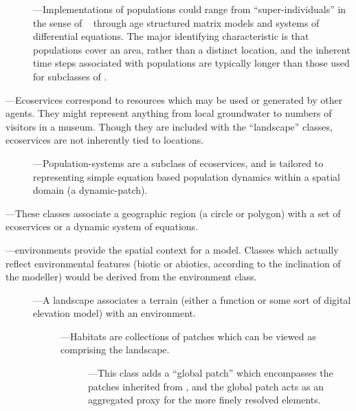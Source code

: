 \begin{description}
\begin{description}
\begin{description}
    \item[]---Implementations of populations
      could range from ``super-individuals'' in the sense of
      ~\citet{scheffer1995super} through age structured matrix
      models and systems of differential equations. The major 
      identifying characteristic is that populations cover an
      area, rather than a distinct location, and the inherent time
      steps associated with populations are typically longer
      than those used for subclasses of .
    \end{description}

  \item[\TTC{ecoservice}]---Ecoservices correspond to resources
    which may be used or generated by other agents.  They might
    represent anything from local groundwater to numbers of visitors
    in a museum.  Though they are included with the
    ``landscape'' classes, ecoservices are not inherently tied to
    locations.

    \begin{description}
    \item[]---Population-systems are a
      subclass of ecoservices, and is tailored to representing
      simple equation based population dynamics within a spatial
      domain (a dynamic-patch).
    \end{description}

  \item[\TTC{patch}, \TTC{dynamic-patch}]---These classes associate a
    geographic region (a circle or polygon) with a set of
    ecoservices or a dynamic system of equations.

  \item[\TTC{environment}]---environments provide the spatial context
    for a model.  Classes which actually reflect environmental
    features (biotic or abiotics, according to the inclination of
    the modeller) would be derived from the environment class.

    \begin{description}
    \item[]---A landscape associates a terrain
      (either a function or some sort of digital elevation model)
      with an environment.
      
      \begin{description}
      \item[]---Habitats are collections of patches
        which can be viewed as comprising the landscape.
        \begin{description}
        \item[]---This class adds a ``global patch''
          which encompasses the patches inherited from ,
          and the global patch acts as an aggregated proxy for the
          more finely resolved elements.
        \end{description}
      \end{description}
    \end{description}
  \end{description}
\end{description}


